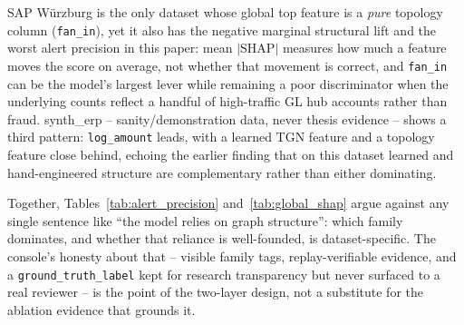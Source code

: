 SAP Würzburg is the only dataset whose global top feature is a
\emph{pure} topology column (\texttt{fan\_in}), yet it also has the
negative marginal structural lift and the worst alert precision in this
paper: mean $|\text{SHAP}|$ measures how much a feature moves the score on
average, not whether that movement is correct, and \texttt{fan\_in} can be
the model's largest lever while remaining a poor discriminator when the
underlying counts reflect a handful of high-traffic GL hub accounts rather
than fraud. synth\_erp -- sanity/demonstration data, never thesis evidence --
shows a third pattern: \texttt{log\_amount} leads, with a learned TGN
feature and a topology feature close behind, echoing the earlier finding
that on this dataset learned and hand-engineered structure are
complementary rather than either dominating.

Together, Tables~\ref{tab:alert_precision} and~\ref{tab:global_shap} argue
against any single sentence like ``the model relies on graph structure'':
which family dominates, and whether that reliance is well-founded, is
dataset-specific. The console's honesty about that -- visible family tags,
replay-verifiable evidence, and a \texttt{ground\_truth\_label} kept for
research transparency but never surfaced to a real reviewer -- is the point
of the two-layer design, not a substitute for the ablation evidence that
grounds it.
